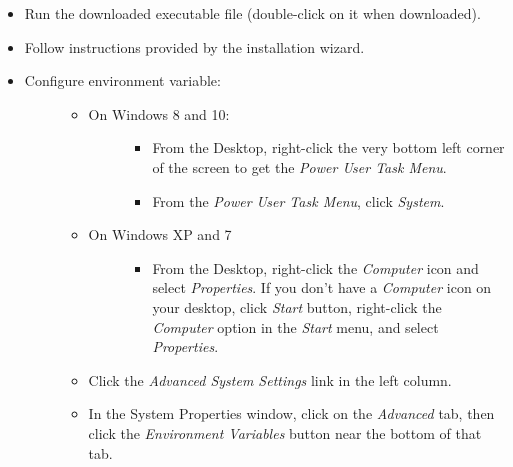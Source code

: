 \documentclass[letterpaper,10pt,english]{sphinxmanual}
\begin{document}
\begin{itemize}
\item {} 
Run the downloaded executable file (double-click on it when downloaded).

\item {} 
Follow instructions provided by the installation wizard.

\item {} \begin{description}
\item[{Configure  environment variable:}] \leavevmode\begin{itemize}
\item {} \begin{description}
\item[{On Windows 8 and 10:}] \leavevmode\begin{itemize}
\item {} 
From the Desktop, right-click the very bottom left corner of the screen to get
the \emph{Power User Task Menu}.

\item {} 
From the \emph{Power User Task Menu}, click \emph{System}.

\end{itemize}

\end{description}

\item {} \begin{description}
\item[{On Windows XP and 7}] \leavevmode\begin{itemize}
\item {} 
From the Desktop, right-click the \emph{Computer} icon and select \emph{Properties}. If you
don't have a \emph{Computer} icon on your desktop, click \emph{Start} button, right-click the
\emph{Computer} option in the \emph{Start} menu, and select \emph{Properties}.

\end{itemize}

\end{description}

\item {} 
Click the \emph{Advanced System Settings} link in the left column.

\item {} 
In the System Properties window, click on the \emph{Advanced} tab,
then click the \emph{Environment Variables} button near the bottom of that tab.


\end{itemize}
\end{description}
\end{itemize}
\end{document}
